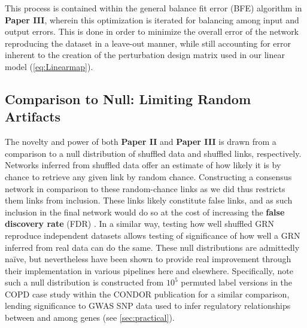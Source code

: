 This process is contained within the general balance fit error (BFE) algorithm in \textbf{Paper III}, wherein this optimization is iterated for balancing among input and output errors. This is done in order to minimize the overall error of the network reproducing the dataset in a leave-out manner, while still accounting for error inherent to the creation of the perturbation design matrix used in our linear model (\cref{eq:Linearmap}).

\subsection{Comparison to Null: Limiting Random Artifacts}
\label{sec:null}
The novelty and power of both \textbf{Paper II} and \textbf{Paper III} is drawn from a comparison to a null distribution of shuffled data and shuffled links, respectively. Networks inferred from shuffled data offer an estimate of how likely it is by chance to retrieve any given link by random chance. Constructing a consensus network in comparison to these random-chance links as we did thus restricts them links from inclusion. These links likely constitute false links, and as such inclusion in the final network would do so at the cost of increasing the \textbf{false discovery rate} (FDR) \citep{kall2007posterior}. In a similar way, testing how well shuffled GRN reproduce independent datasets allows testing of significance of how well a GRN inferred from real data can do the same. These null distributions are admittedly na{\"i}ve, but nevertheless have been shown to provide real improvement through their implementation in various pipelines here and elsewhere. Specifically, note such a null distribution is constructed from $10^5$ permuted label versions \citep{platig2016bipartite} in the COPD case study within the CONDOR publication for a similar comparison, lending significance to GWAS SNP data used to infer regulatory relationships between and among genes (see \cref{sec:practical}).